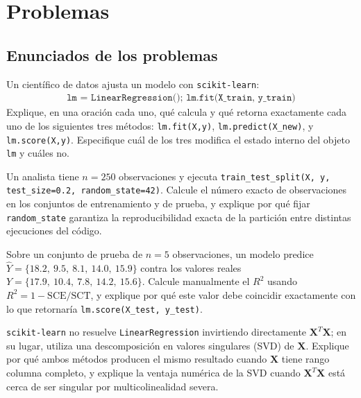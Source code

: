 \section*{Problemas}

\subsection*{Enunciados de los problemas}

\begin{problema}
	\label{prob:eaaa432}
	Un científico de datos ajusta un modelo con \texttt{scikit-learn}:
	\begin{align}
		\texttt{lm = LinearRegression(); lm.fit(X\_train, y\_train)}
	\end{align}
	Explique, en una oración cada uno, qué calcula y qué retorna exactamente cada uno de los siguientes tres métodos: \texttt{lm.fit(X,y)}, \texttt{lm.predict(X\_new)}, y \texttt{lm.score(X,y)}. Especifique cuál de los tres modifica el estado interno del objeto \texttt{lm} y cuáles no.
\end{problema}

\begin{problema}
	\label{prob:ab54576}
	Un analista tiene $n=250$ observaciones y ejecuta \texttt{train\_test\_split(X, y, test\_size=0.2, random\_state=42)}. Calcule el número exacto de observaciones en los conjuntos de entrenamiento y de prueba, y explique por qué fijar \texttt{random\_state} garantiza la reproducibilidad exacta de la partición entre distintas ejecuciones del código.
\end{problema}

\begin{problema}
	\label{prob:7554cf7}
	Sobre un conjunto de prueba de $n=5$ observaciones, un modelo predice $\hat Y=\{18.2,\ 9.5,\ 8.1,\ 14.0,\ 15.9\}$ contra los valores reales $Y=\{17.9,\ 10.4,\ 7.8,\ 14.2,\ 15.6\}$. Calcule manualmente el $R^2$ usando $R^2=1-\text{SCE}/\text{SCT}$, y explique por qué este valor debe coincidir exactamente con lo que retornaría \texttt{lm.score(X\_test, y\_test)}.
\end{problema}

\begin{problema}
	\label{prob:011e008}
	\texttt{scikit-learn} no resuelve \texttt{LinearRegression} invirtiendo directamente $\mathbf{X}^T\mathbf{X}$; en su lugar, utiliza una descomposición en valores singulares (SVD) de $\mathbf{X}$. Explique por qué ambos métodos producen el mismo resultado cuando $\mathbf{X}$ tiene rango columna completo, y explique la ventaja numérica de la SVD cuando $\mathbf{X}^T\mathbf{X}$ está cerca de ser singular por multicolinealidad severa.
\end{problema}

